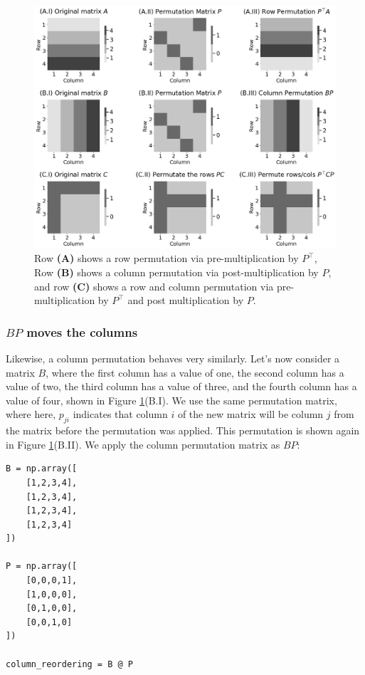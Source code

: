 \begin{figure}
    \centering
    \includegraphics[width=\linewidth]{applications/ch8/Images/gm_perm.png}
    \caption[Permutation matrices]{Row \textbf{(A)} shows a row permutation via pre-multiplication by $P^\top$, Row \textbf{(B)} shows a column permutation via post-multiplication by $P$, and row \textbf{(C)} shows a row and column permutation via pre-multiplication by $P^\top$ and post multiplication by $P$.}
    \label{fig:ch8:gm:perm}
\end{figure}
\subsubsection*{$BP$ moves the columns}

Likewise, a column permutation behaves very similarly. Let's now consider a matrix $B$, where the first column has a value of one, the second column has a value of two, the third column has a value of three, and the fourth column has a value of four, shown in Figure \ref{fig:ch8:gm:perm}(B.I). We use the same permutation matrix, where here, $p_{ji}$ indicates that column $i$ of the new matrix will be column $j$ from the matrix before the permutation was applied. This permutation is shown again in Figure \ref{fig:ch8:gm:perm}(B.II). We apply the column permutation matrix as $BP$:

\begin{lstlisting}[style=python]
B = np.array([
    [1,2,3,4],
    [1,2,3,4],
    [1,2,3,4],
    [1,2,3,4]
])

P = np.array([
    [0,0,0,1],
    [1,0,0,0],
    [0,1,0,0],
    [0,0,1,0]
])

column_reordering = B @ P
\end{lstlisting}

